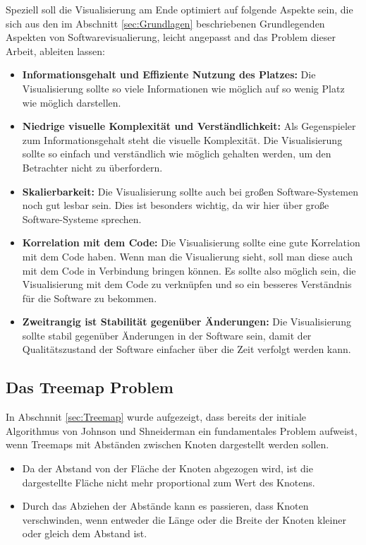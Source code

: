 Speziell soll die Visualisierung am Ende optimiert auf folgende Aspekte sein, die sich aus den im Abschnitt \ref{sec:Grundlagen} beschriebenen Grundlegenden Aspekten von Softwarevisualierung, leicht angepasst and das Problem dieser Arbeit, ableiten lassen: 

\begin{itemize}
    \item \textbf{Informationsgehalt und Effiziente Nutzung des Platzes:} Die Visualisierung sollte so viele Informationen wie möglich auf so wenig Platz wie möglich darstellen.
    \item \textbf{Niedrige visuelle Komplexität und Verständlichkeit:} Als Gegenspieler zum Informationsgehalt steht die visuelle Komplexität. Die Visualisierung sollte so einfach und verständlich wie möglich gehalten werden, um den Betrachter nicht zu überfordern.
    \item \textbf{Skalierbarkeit:} Die Visualisierung sollte auch bei großen Software-Systemen noch gut lesbar sein. Dies ist besonders wichtig, da wir hier über große Software-Systeme sprechen.
    \item \textbf{Korrelation mit dem Code:} Die Visualisierung sollte eine gute Korrelation mit dem Code haben. Wenn man die Visualierung sieht, soll man diese auch mit dem Code in Verbindung bringen können. Es sollte also möglich sein, die Visualisierung mit dem Code zu verknüpfen und so ein besseres Verständnis für die Software zu bekommen.
    \item \textbf{Zweitrangig ist Stabilität gegenüber Änderungen:} Die Visualisierung sollte stabil gegenüber Änderungen in der Software sein, damit der Qualitätszustand der Software einfacher über die Zeit verfolgt werden kann.
\end{itemize}


\subsection{Das Treemap Problem} \label{sec:TreemapProblem}
In Abschnnit \ref{sec:Treemap} wurde aufgezeigt, dass bereits der initiale Algorithmus von Johnson und Shneiderman \cite{johnson1991tree} ein fundamentales Problem aufweist, wenn Treemaps mit Abständen zwischen Knoten dargestellt werden sollen. 
\begin{itemize}
    \item Da der Abstand von der Fläche der Knoten abgezogen wird, ist die dargestellte Fläche nicht mehr proportional zum Wert des Knotens.
    \item Durch das Abziehen der Abstände kann es passieren, dass Knoten verschwinden, wenn entweder die Länge oder die Breite der Knoten kleiner oder gleich dem Abstand ist.
\end{itemize}

